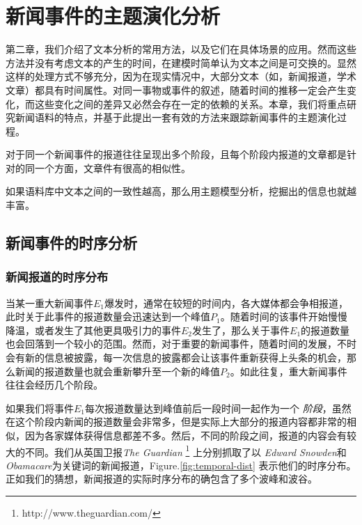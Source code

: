 \chapter{新闻事件的主题演化分析}
第二章，我们介绍了文本分析的常用方法，以及它们在具体场景的应用。然而这些方法并没有考虑文本的产生的时间，在建模时简单认为文本之间是可交换的。显然这样的处理方式不够充分，因为在现实情况中，大部分文本（如，新闻报道，学术文章）都具有时间属性。对同一事物或事件的叙述，随着时间的推移一定会产生变化，而这些变化之间的差异又必然会存在一定的依赖的关系。本章，我们将重点研究新闻语料的特点，并基于此提出一套有效的方法来跟踪新闻事件的主题演化过程。

\begin{hyp}
\label{hyp:newsdistribution}
对于同一个新闻事件的报道往往呈现出多个阶段，且每个阶段内报道的文章都是针对的同一个方面，文章件有很高的相似性。
\end{hyp}

\begin{hyp}
\label{hyp:coherence}
如果语料库中文本之间的一致性越高，那么用主题模型分析，挖掘出的信息也就越丰富。
\end{hyp}

\section{新闻事件的时序分析}
\subsection{新闻报道的时序分布}
当某一重大新闻事件$E_1$爆发时，通常在较短的时间内，各大媒体都会争相报道，此时关于此事件的报道数量会迅速达到一个峰值$P_1$。随着时间的该事件开始慢慢降温，或者发生了其他更具吸引力的事件$E_2$发生了，那么关于事件$E_1$的报道数量也会回落到一个较小的范围。然而，对于重要的新闻事件，随着时间的发展，不时会有新的信息被披露，每一次信息的披露都会让该事件重新获得上头条的机会，那么新闻的报道数量也就会重新攀升至一个新的峰值$P_2$。如此往复，重大新闻事件往往会经历几个阶段。

如果我们将事件$E_1$每次报道数量达到峰值前后一段时间一起作为一个 \emph{阶段}，虽然在这个阶段内新闻的报道数量会非常多，但是实际上大部分的报道内容都非常的相似，因为各家媒体获得信息都差不多。然后，不同的阶段之间，报道的内容会有较大的不同。我们从英国卫报\emph{The Guardian} \footnote{http://www.theguardian.com/} 上分别抓取了以 \emph{Edward Snowden}和\emph{Obamacare}为关键词的新闻报道，Figure.\ref{fig:temporal-dist} 表示他们的时序分布。正如我们的猜想，新闻报道的实际时序分布的确包含了多个波峰和波谷。

